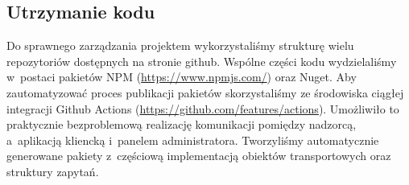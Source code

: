 \documentclass[../opis-rozwiazania.tex]{subfiles}
\begin{document}
\subsection{Utrzymanie kodu}
Do sprawnego zarządzania projektem wykorzystaliśmy strukturę wielu repozytoriów dostępnych na stronie github.
Wspólne części kodu wydzielaliśmy w~postaci pakietów NPM (\url{https://www.npmjs.com/}) oraz Nuget.
Aby zautomatyzować proces publikacji pakietów skorzystaliśmy ze środowiska ciągłej integracji Github Actions (\url{https://github.com/features/actions}).
Umożliwiło to praktycznie bezproblemową realizację komunikacji pomiędzy nadzorcą, a~aplikacją kliencką i~panelem administratora.
Tworzyliśmy automatycznie generowane pakiety z~częściową implementacją obiektów transportowych oraz struktury zapytań.
\end{document}
